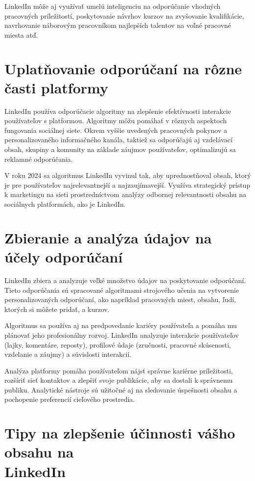 \documentclass[slovak,a4paper]{coursepaper}
\begin{document}
LinkedIn môže aj využívať umelú inteligenciu na odporúčanie vhodných pracovných príležitostí, poskytovanie návrhov kurzov na zvyšovanie kvalifikácie, navrhovanie náborovým pracovníkom najlepších talentov na voľné pracovné miesta atď.~\cite{9}

\section{Uplatňovanie odporúčaní na rôzne časti platformy} \label{Uplatňovanie}
LinkedIn používa odporúčacie algoritmy na zlepšenie efektívnosti interakcie používateľov s platformou.
Algoritmy môžu pomáhať v rôznych aspektoch fungovania sociálnej siete.
Okrem vyššie uvedených pracovných pokynov a personalizovaného informačného kanála, taktiež sa odporúčajú aj vzdelávací obsah, skupiny a komunity na základe záujmov používateľov, optimalizujú sa reklamné odporúčania.

V roku 2024 sa algoritmus LinkedIn vyvinul tak, aby uprednostňoval obsah, ktorý je pre používateľov najrelevantnejší a najzaujímavejší.
Využíva strategický prístup k marketingu na sieti prostredníctvom analýzy odbornej relevantnosti obsahu na sociálnych platformách, ako je LinkedIn.~\cite{10}


\section{Zbieranie a analýza údajov na účely odporúčaní} \label{analýza údajov}
LinkedIn zbiera a analyzuje veľké množstvo údajov na poskytovanie odporúčaní. Tieto odporúčania sú spracované algoritmami strojového učenia na vytvorenie personalizovaných odporúčaní, ako napríklad pracovných miest, obsahu, ľudí, ktorých si môžete pridať, a kurzov.

Algoritmus sa používa aj na predpovedanie kariéry používateľa a pomáha mu plánovať jeho profesionálny rozvoj. LinkedIn analyzuje interakcie používateľov (lajky, komentáre, reposty), profilové údaje (zručnosti, pracovné skúsenosti, vzdelanie a záujmy) a súvislosti interakcií.~\cite{11}

Analýza platformy pomáha používateľom nájsť správne kariérne príležitosti, rozšíriť sieť kontaktov a zlepšiť svoje publikácie, aby sa dostali k správnemu publiku. Analytické nástroje sú užitočné aj na sledovanie úspešnosti obsahu a pochopenie preferencií cieľového prostredia.

\section{\texorpdfstring{Tipy na zlepšenie účinnosti vášho obsahu na \\ LinkedIn}{Tipy na zlepšenie účinnosti vášho obsahu na LinkedIn}}
\label{Tipy}
\end{document}
